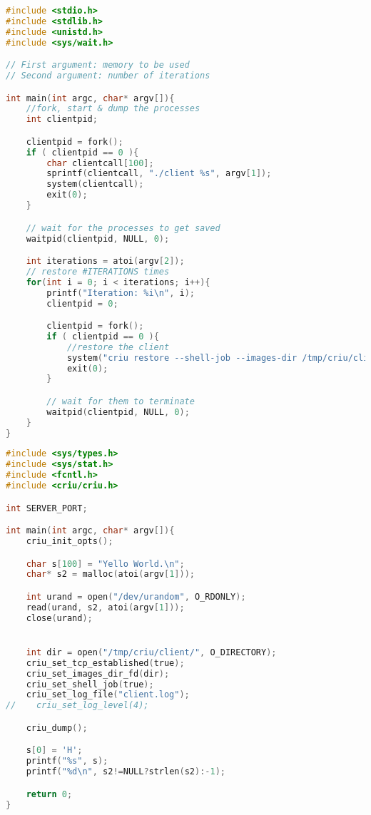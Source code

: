 \documentclass[a4paper]{article}
\begin{document}
\clearpage
\begin{lstlisting}[caption=Ohne TCP: Launcher,language=C]
#include <stdio.h>
#include <stdlib.h>
#include <unistd.h>
#include <sys/wait.h>

// First argument: memory to be used
// Second argument: number of iterations

int main(int argc, char* argv[]){
    //fork, start & dump the processes
    int clientpid;

    clientpid = fork();
    if ( clientpid == 0 ){
        char clientcall[100];
        sprintf(clientcall, "./client %s", argv[1]);
        system(clientcall);
        exit(0);
    }

    // wait for the processes to get saved
    waitpid(clientpid, NULL, 0);

    int iterations = atoi(argv[2]);
    // restore #ITERATIONS times
    for(int i = 0; i < iterations; i++){
        printf("Iteration: %i\n", i);
        clientpid = 0;

        clientpid = fork();
        if ( clientpid == 0 ){
            //restore the client
            system("criu restore --shell-job --images-dir /tmp/criu/client");
            exit(0);
        }

        // wait for them to terminate
        waitpid(clientpid, NULL, 0);
    }
}
\end{lstlisting}

\begin{lstlisting}[caption=Ohne TCP: Client,language=C]
#include <sys/types.h>
#include <sys/stat.h>
#include <fcntl.h>
#include <criu/criu.h>

int SERVER_PORT;

int main(int argc, char* argv[]){
    criu_init_opts();

    char s[100] = "Yello World.\n";
    char* s2 = malloc(atoi(argv[1]));

    int urand = open("/dev/urandom", O_RDONLY);
    read(urand, s2, atoi(argv[1]));
    close(urand);


    int dir = open("/tmp/criu/client/", O_DIRECTORY);
    criu_set_tcp_established(true);
    criu_set_images_dir_fd(dir);
    criu_set_shell_job(true);
    criu_set_log_file("client.log");
//    criu_set_log_level(4);

    criu_dump();

    s[0] = 'H';
    printf("%s", s);
    printf("%d\n", s2!=NULL?strlen(s2):-1);

    return 0;
}
\end{lstlisting}
\end{document}

